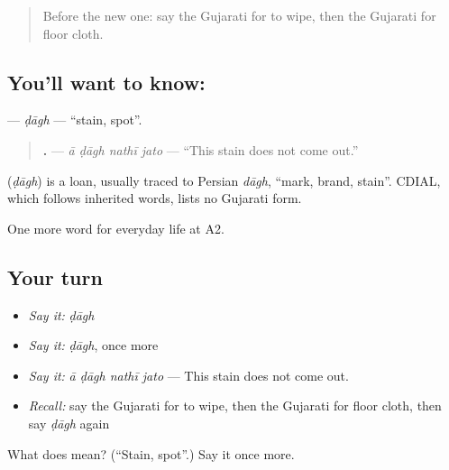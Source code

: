\label{lesson:GU-C158-dagh}



\begin{quote}
Before the new one: say the Gujarati for to wipe, then the Gujarati for floor cloth.
\end{quote}

\subsection*{You'll want to know: }
\textbf{} — \emph{ḍāgh} — \textquotedblleft{}stain, spot\textquotedblright{}.

\begin{quote}
\textbf{   .} — \emph{ā ḍāgh nathī jato} — \textquotedblleft{}This stain does not come out.\textquotedblright{}
\end{quote}

\begin{cousinweb}
\textbf{} (\emph{ḍāgh}) is a loan, usually traced to Persian \emph{dāgh}, \textquotedblleft{}mark, brand, stain\textquotedblright{}. CDIAL, which follows inherited words, lists no Gujarati form.
\end{cousinweb}

\begin{grammarlens}[title={What you've built}]
One more word for everyday life at A2.
\end{grammarlens}

\subsection*{Your turn}
\begin{itemize}
\raggedright
  \item \emph{Say it:} \emph{ḍāgh}
  \item \emph{Say it:} \emph{ḍāgh}, once more
  \item \emph{Say it:} \emph{ā ḍāgh nathī jato} — This stain does not come out.
  \item \emph{Recall:} say the Gujarati for to wipe, then the Gujarati for floor cloth, then say \emph{ḍāgh} again
\end{itemize}

\begin{tcolorbox}[breakable,colback=teal!4,colframe=teal!35!black,title={Before you move on}]
What does  mean? (\textquotedblleft{}Stain, spot\textquotedblright{}.) Say it once more.
\end{tcolorbox}
